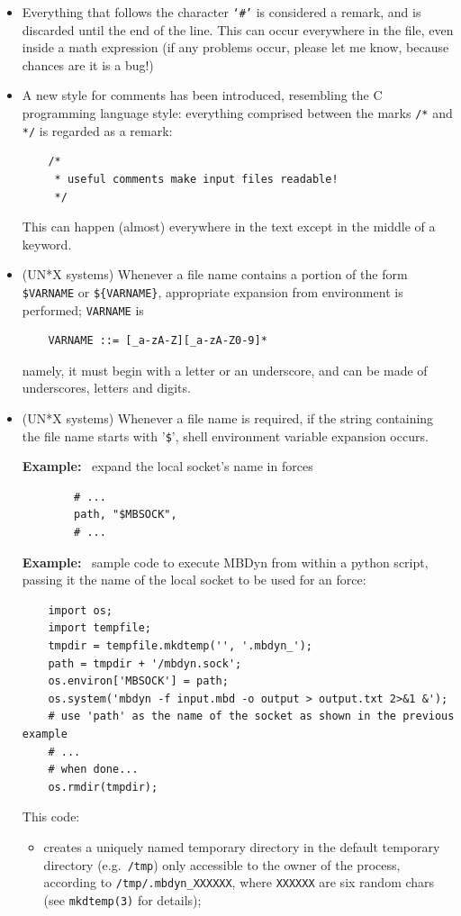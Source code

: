 \begin{itemize}
    \item Everything that follows the character \texttt{`\#'} is considered a
    remark, and is discarded until the end of the line. 
    This can occur everywhere in the file, even inside a math expression 
    (if any problems occur, please let me know, because chances are 
    it is a bug!)
    
    \item A new style for comments has been introduced, resembling the 
    C programming language style: everything comprised between the marks
    \texttt{/*} and \texttt{*/} is regarded as a remark:
\begin{verbatim}
    /*
     * useful comments make input files readable!
     */
\end{verbatim}
    This can happen (almost) everywhere in the text except in the middle 
    of a keyword.
    
    \item (UN*X systems) Whenever a file name contains a portion
    of the form \verb;$VARNAME; or \verb;${VARNAME};, appropriate
    expansion from environment is performed; \verb;VARNAME; is
\begin{verbatim}
    VARNAME ::= [_a-zA-Z][_a-zA-Z0-9]*
\end{verbatim}
    namely, it must begin with a letter or an underscore, and can be
    made of underscores, letters and digits.

    \item (UN*X systems) Whenever a file name is required, if the string
    containing the file name starts with '\texttt{\$}', shell environment
    variable expansion occurs.

    \textbf{Example:} \
    expand the local socket's name in  forces
\begin{verbatim}
        # ...
        path, "$MBSOCK",
        # ...
\end{verbatim}

    \textbf{Example:} \
    sample code to execute MBDyn from within a python script,
    passing it the name of the local socket to be used
    for an \kw{external} force:
\begin{verbatim}
    import os;
    import tempfile;
    tmpdir = tempfile.mkdtemp('', '.mbdyn_');
    path = tmpdir + '/mbdyn.sock';
    os.environ['MBSOCK'] = path;
    os.system('mbdyn -f input.mbd -o output > output.txt 2>&1 &');
    # use 'path' as the name of the socket as shown in the previous example
    # ...
    # when done...
    os.rmdir(tmpdir);
\end{verbatim}
    This code:
    \begin{itemize}
    \item creates a uniquely named temporary directory
    in the default temporary directory (e.g.\ \texttt{/tmp})
    only accessible to the owner of the process, according
    to \texttt{/tmp/.mbdyn\_XXXXXX}, where \texttt{XXXXXX}
    are six random chars (see \texttt{mkdtemp(3)} for details);


\end{itemize}
\end{itemize}
